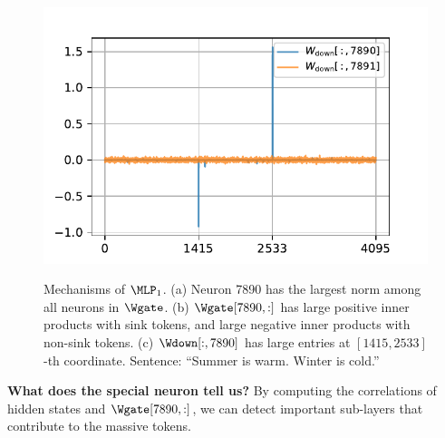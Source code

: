 \begin{figure}[H]
\begin{minipage}{.32\textwidth}
    \centering
    \subcaption{{\footnotesize $\Wdown[:, i]$}}\label{fig:w3}
    \includegraphics[width=.95\textwidth]{Figures/Summer/w3.pdf}
\end{minipage}
\caption{
\small
Mechanisms of $\MLP_1$. (a) Neuron 7890 has the largest norm among all neurons in $\Wgate$. (b) $\Wgate[7890, :]$ has large positive inner products with sink tokens, and large negative inner products with non-sink tokens. (c) $\Wdown[:, 7890]$ has large entries at $[1415, 2533]$-th coordinate.
Sentence: ``Summer is warm. Winter is cold.''
}
\label{fig:special-neuron}
\vspace{-1em}
\end{figure}

\textbf{What does the special neuron tell us?} By computing the correlations of hidden states and $\Wgate[7890, :]$, we can detect important sub-layers that contribute to the massive tokens.

